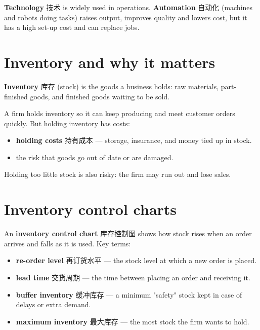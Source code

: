 \documentclass[11pt]{article}
\begin{document}
\textbf{Technology} 技术 is widely used in operations. \textbf{Automation} 自动化 (machines and robots doing tasks) raises output, improves quality and lowers cost, but it has a high set-up cost and can replace jobs.

\section*{Inventory and why it matters}

\textbf{Inventory} 库存 (stock) is the goods a business holds: raw materials, part-finished goods, and finished goods waiting to be sold.

A firm holds inventory so it can keep producing and meet customer orders quickly. But holding inventory has costs:

\begin{itemize}
\item \textbf{holding costs} 持有成本 — storage, insurance, and money tied up in stock.

\item the risk that goods go out of date or are damaged.

\end{itemize}

Holding too little stock is also risky: the firm may run out and lose sales.

\section*{Inventory control charts}

An \textbf{inventory control chart} 库存控制图 shows how stock rises when an order arrives and falls as it is used. Key terms:

\begin{itemize}
\item \textbf{re-order level} 再订货水平 — the stock level at which a new order is placed.

\item \textbf{lead time} 交货周期 — the time between placing an order and receiving it.

\item \textbf{buffer inventory} 缓冲库存 — a minimum "safety" stock kept in case of delays or extra demand.

\item \textbf{maximum inventory} 最大库存 — the most stock the firm wants to hold.

\end{itemize}
\end{document}
